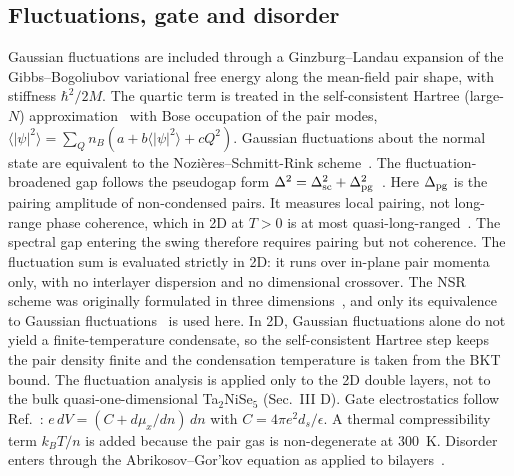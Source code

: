 \documentclass[aip,jap,reprint,amsmath,amssymb]{revtex4-2}
\begin{document}
\subsection{Fluctuations, gate and disorder}
Gaussian fluctuations are included through a Ginzburg--Landau expansion of the Gibbs--Bogoliubov variational
free energy along the mean-field pair shape, with stiffness $\hbar^2/2M$. The quartic term is treated in the
self-consistent Hartree (large-$N$) approximation~\cite{UllahDorsey1991,LarkinVarlamov2005} with Bose occupation of
the pair modes, $\langle|\psi|^2\rangle=\sum_Q n_B(a+b\langle|\psi|^2\rangle+cQ^2)$. Gaussian fluctuations
about the normal state are equivalent to the Nozi\`eres--Schmitt-Rink scheme~\cite{NozieresSchmittRink1985,Randeria2014}.
The fluctuation-broadened gap follows the pseudogap form $\Delta^2=\Delta_{\rm sc}^2+\Delta_{\rm pg}^2$~\cite{Chen2005}. Here $\Delta_{\rm pg}$ is the pairing amplitude of non-condensed pairs. It measures local pairing, not long-range phase coherence, which in 2D at $T>0$ is at most quasi-long-ranged~\cite{NelsonKosterlitz1977}. The spectral gap entering the swing therefore requires pairing but not coherence. The fluctuation sum is evaluated strictly in 2D: it runs over in-plane pair momenta only, with no interlayer dispersion and no dimensional crossover. The NSR scheme was originally formulated in three dimensions~\cite{NozieresSchmittRink1985}, and only its equivalence to Gaussian fluctuations~\cite{Randeria2014} is used here. In 2D, Gaussian fluctuations alone do not yield a finite-temperature condensate, so the self-consistent Hartree step keeps the pair density finite and the condensation temperature is taken from the BKT bound. The fluctuation analysis is applied only to the 2D double layers, not to the bulk quasi-one-dimensional Ta$_2$NiSe$_5$ (Sec.~III D).
Gate electrostatics follow Ref.~: $e\,dV=(C+d\mu_x/dn)\,dn$ with
$C=4\pi e^2d_s/\epsilon$. A thermal compressibility term $k_BT/n$ is added because the pair gas is non-degenerate at 300~K.
Disorder enters through the Abrikosov--Gor'kov equation as applied to bilayers~\cite{Bistritzer2008}.
\end{document}
